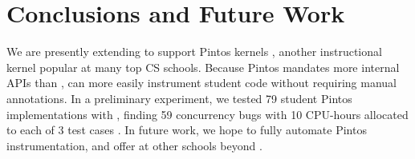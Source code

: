 \documentclass{sig-alternate-05-2015}
\newcommand\x[1]{\lstinline{#1}}
\begin{document}


\printccsdesc







\section{Conclusions and Future Work}

We are presently extending \landslide to support Pintos kernels \cite{pintos},
another instructional kernel popular at many top CS schools.
Because Pintos mandates more internal APIs than \pebbles,
\landslide can more easily instrument student code without requiring manual annotations.
In a preliminary experiment, we tested 79 student Pintos implementations with \landslide,
finding 59 concurrency bugs with 10 CPU-hours allocated to each of 3 test cases \cite{quicksand-anonymized}.
In future work, we hope to fully automate Pintos instrumentation, and offer \landslide at other schools beyond \cmu.






\end{document}
